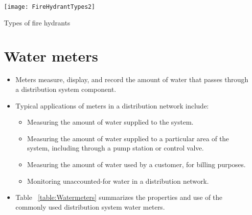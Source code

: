 \begin{table}[H]
\begin{center}
        \texttt{[image: FireHydrantTypes2]}
        \caption{Types of fire hydrants}
\end{center}
\end{table}

\section{Water meters}
\begin{itemize}
\item \begin{singlespacing}Meters measure, display, and record the amount of water that passes through a distribution system component. \end{singlespacing}

\item Typical applications of meters in a distribution network include:

\begin{itemize}
\item Measuring the amount of water supplied to the system.

\item Measuring the amount of water supplied to a particular area of the system, including through a pump station or control valve.

\item Measuring the amount of water used by a customer, for billing purposes.

\item Monitoring unaccounted-for water in a distribution network.\\

\end{itemize}
\item Table ~\ref{table:Watermeters} summarizes the properties and use of the commonly used distribution system water meters.
\end{itemize}
\vspace{-0.5em}

